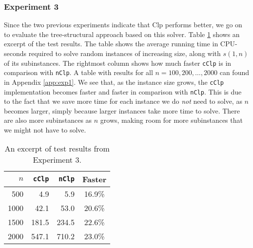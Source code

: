\subsubsection{Experiment 3}
Since the two previous experiments indicate that Clp performs better, we
go on to evaluate the tree-structural approach based on this solver.
Table \ref{table:expfour} shows an excerpt of the test results. The table
shows the average running time in CPU-seconds required to solve random instances
of increasing size, along with $s(1, n)$ of its subinstances. The rightmost
column shows how much faster \texttt{cClp} is in comparison with \texttt{nClp}.
A table with results for all $n=100,200,\ldots,2000$ can found in Appendix
\ref{app:exp1}.
We see that, as the instance size grows, the \texttt{cClp}
implementation becomes faster and faster in comparison with
\texttt{nClp}.
This is due to the fact that we save more time for each instance we do
\emph{not} need to solve, as $n$ becomes larger, simply because larger instances
take more time to solve.
There are also more subinstances as $n$ grows, making room for more subinstances
that we might not have to solve.

\begin{table}[ht!]
    \centering
    \caption{An excerpt of test results from Experiment 3.}
    \label{table:expfour}
\begin{tabular}{rrrc}
    $n$ & \texttt{cClp}  & \texttt{nClp}  & Faster \\ \hline
    500 & 4.9   & 5.9   & 16.9\% \\
   1000 & 42.1  & 53.0  & 20.6\% \\
   1500 & 181.5 & 234.5 & 22.6\% \\
   2000 & 547.1 & 710.2 & 23.0\%
\end{tabular}
\end{table}

